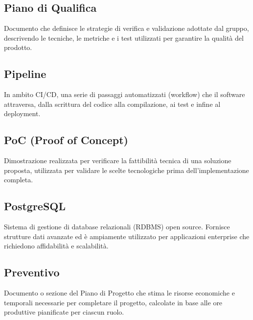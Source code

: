 \documentclass[a4paper, 11pt, oneside]{scrartcl} %
\begin{document}
\vspace{0.5cm}

\subsection*{Piano di Qualifica}


Documento che definisce le strategie di verifica e validazione adottate dal gruppo, descrivendo le tecniche, le metriche e i test utilizzati per garantire la qualità del prodotto.

\vspace{0.5cm}

\subsection*{Pipeline}
In ambito CI/CD, una serie di passaggi automatizzati (workflow) che il software attraversa, dalla scrittura del codice alla compilazione, ai test e infine al deployment.
\vspace{0.5cm}

\subsection*{PoC (Proof of Concept)}


Dimostrazione realizzata per verificare la fattibilità tecnica di una soluzione proposta, utilizzata per validare le scelte tecnologiche prima dell'implementazione completa.

\vspace{0.5cm}

\subsection*{PostgreSQL}


Sistema di gestione di database relazionali (RDBMS) open source. Fornisce strutture dati avanzate ed è ampiamente utilizzato per applicazioni enterprise che richiedono affidabilità e scalabilità.

\vspace{0.5cm}

\subsection*{Preventivo}
Documento o sezione del Piano di Progetto che stima le risorse economiche e temporali necessarie per completare il progetto, calcolate in base alle ore produttive pianificate per ciascun ruolo.
\vspace{0.5cm}
\end{document}
